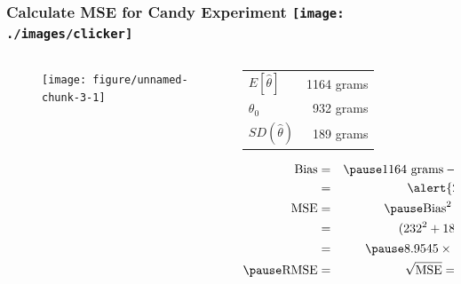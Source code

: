 \begin{frame}
\frametitle{Calculate MSE for Candy Experiment \hfill \texttt{[image: ./images/clicker]}}


\begin{columns} 

\begin{column}[c]{4cm} 
\begin{figure}
\begin{knitrout}
\color{fgcolor}

{\centering \texttt{[image: figure/unnamed-chunk-3-1]} 

}



\end{knitrout}
\end{figure}

\end{column} 

\begin{column}[c]{6cm} 
\small
   \begin{tabular}{lr}
   \hline
   \hline
   $E[\hat{\theta}]$& 1164 grams\\
   $\theta_0$& 932 grams\\
   $SD(\widehat{\theta})$& 189 grams\\
   \hline
   \end{tabular}
\vspace{2em}

\begin{eqnarray*}
	\mbox{Bias} &=& \pause 1164 \mbox{ grams} - 932 \mbox{ grams}\\
		&=& \alert{232 \mbox{ grams}}\\
		\mbox{MSE} &=&\pause  \mbox{Bias}^2 + \mbox{Variance}\\
			&=& (232^2 + 189^2)\mbox{ grams}^2\\
				&=&\pause \ensuremath{8.9545\times 10^{4}} \mbox{ grams}^2\\ \pause
				\mbox{RMSE} &=& \sqrt{\mbox{MSE}} =  299 \mbox{ grams}
\end{eqnarray*}
\end{column} 

\end{columns} 


\end{frame}
